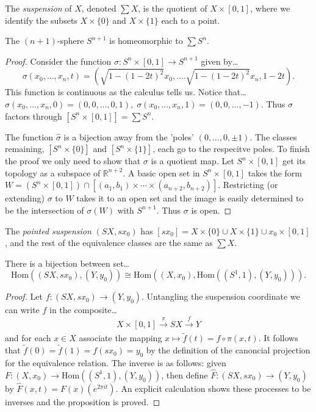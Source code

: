 \label{suspension}
The \emph{suspension} of $X$, denoted $\sum X$, is the quotient of $X \times [0,1]$, where we identify the subsets $X \times \{ 0 \}$ and $X \times \{ 1 \}$
each to a point.

\begin{proposition}
The $(n+1)$-sphere $S^{n+1}$ is homeomorphic to $\sum S^n$.
\end{proposition}

\begin{proof}
Consider the function $\sigma : S^n \times [0,1] \rightarrow S^{n+1}$ given by\dots
$$\sigma(x_0, \dots, x_n,t) = (\sqrt{1 - (1-2t)^2}x_0, \dots. \sqrt{1 - (1 -2t)^2}x_n, 1 -2t).$$
This function is continuous as the calculus tells us. Notice that\dots
$\sigma(x_0, \dots, x_n, 0) = (0,0,\dots,0,1), \; \sigma(x_0, \dots, x_n, 1) = (0,0,\dots, -1).$
Thus $\sigma$ factors through $[S^n \times [0,1]] = \sum S^n$.
\begin{figure}[H]
\centering

\end{figure}
The function $\hat{\sigma}$ is a bijection away from the 'poles' $(0,\dots,0,\pm 1)$. The classes remaining, $[S^n \times \{ 0 \}]$ and
$[S^n \times \{ 1 \}]$, each go to the respecitve poles. To finish the proof we only need to show that $\sigma$ is a quotient map. Let
$S^n \times [0,1]$ get its topology as a subspace of $\mathbb{R}^{n+2}$. A basic open set in $S^n \times [0,1]$ takes the form
$W = (S^n \times [0,1]) \cap [(a_1, b_1) \times \cdots \times (a_{n+2}, b_{n+2})]$. Restricting (or extending) $\sigma$ to $W$ takes it
to an open set and the image is easily determined to be the intersection of $\sigma(W)$ with $S^{n+1}$. Thus $\sigma$ is open.
\end{proof}

\label{pointedsuspension}
The \emph{pointed suspension} $(SX, sx_0)$ has $[sx_0] = X \times \{ 0 \} \cup X \times \{ 1 \} \cup x_0 \times [0,1]$,
and the rest of the equivalence classes are the same as $\sum X$.

\begin{proposition}
There is a bijection between set\dots
$$\textrm{Hom}((SX,sx_0),(Y,y_0)) \cong \textrm{Hom}((X,x_0),\textrm{Hom}((S^1,1),(Y,y_0))).$$
\end{proposition}

\begin{proof}
Let $f : (SX, sx_0) \rightarrow (Y,y_0)$. Untangling the suspension coordinate we can write $f$ in the composite\dots
$$X \times [0,1] \xrightarrow[]{\pi} SX \xrightarrow[]{f} Y$$
and for each $x \in X$ associate the mapping $x \mapsto \tilde f (t) = f \circ \pi (x,t).$ It follows that $\tilde f (0) = \tilde f (1) = f(sx_0) = y_0$
by the definition of the canoncial projection for the equivalence relation. The inverse is as follows: given $F : (X,x_0) \rightarrow \textrm{Hom}((S^1,1),(Y,y_0))$,
then define $\hat{F} : (SX, sx_0) \rightarrow (Y, y_0)$ by $\hat{F}(x,t) = F(x)(e^{2 \pi i t})$. An explicit calculation shows these processes to be inverses and the
proposition is proved.
\end{proof}

